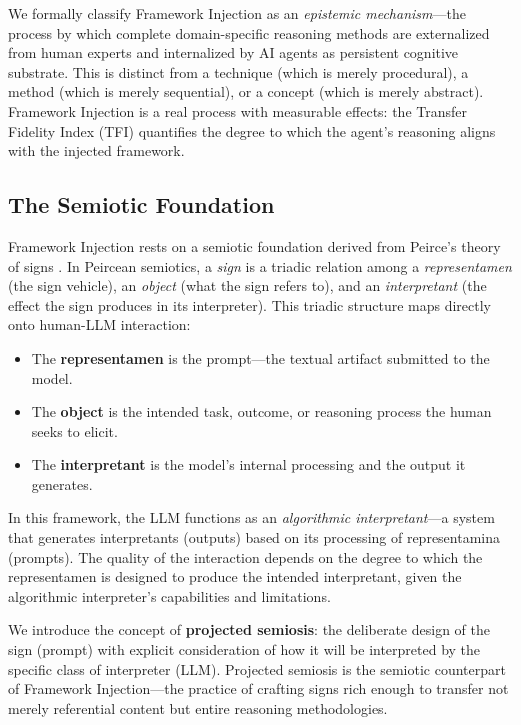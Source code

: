 \documentclass[12pt,a4paper]{article}
\begin{document}
We formally classify Framework Injection as an \emph{epistemic mechanism}---the process by which complete domain-specific reasoning methods are externalized from human experts and internalized by AI agents as persistent cognitive substrate. This is distinct from a technique (which is merely procedural), a method (which is merely sequential), or a concept (which is merely abstract). Framework Injection is a real process with measurable effects: the Transfer Fidelity Index (TFI) quantifies the degree to which the agent's reasoning aligns with the injected framework.

\subsection{The Semiotic Foundation}
\label{sec:definition:semiotics}

Framework Injection rests on a semiotic foundation derived from Peirce's theory of signs \citep{peirce1931collected}. In Peircean semiotics, a \emph{sign} is a triadic relation among a \emph{representamen} (the sign vehicle), an \emph{object} (what the sign refers to), and an \emph{interpretant} (the effect the sign produces in its interpreter). This triadic structure maps directly onto human-LLM interaction:

\begin{itemize}
    \item The \textbf{representamen} is the prompt---the textual artifact submitted to the model.
    \item The \textbf{object} is the intended task, outcome, or reasoning process the human seeks to elicit.
    \item The \textbf{interpretant} is the model's internal processing and the output it generates.
\end{itemize}

In this framework, the LLM functions as an \emph{algorithmic interpretant}---a system that generates interpretants (outputs) based on its processing of representamina (prompts). The quality of the interaction depends on the degree to which the representamen is designed to produce the intended interpretant, given the algorithmic interpreter's capabilities and limitations.

We introduce the concept of \textbf{projected semiosis}: the deliberate design of the sign (prompt) with explicit consideration of how it will be interpreted by the specific class of interpreter (LLM). Projected semiosis is the semiotic counterpart of Framework Injection---the practice of crafting signs rich enough to transfer not merely referential content but entire reasoning methodologies.
\end{document}
